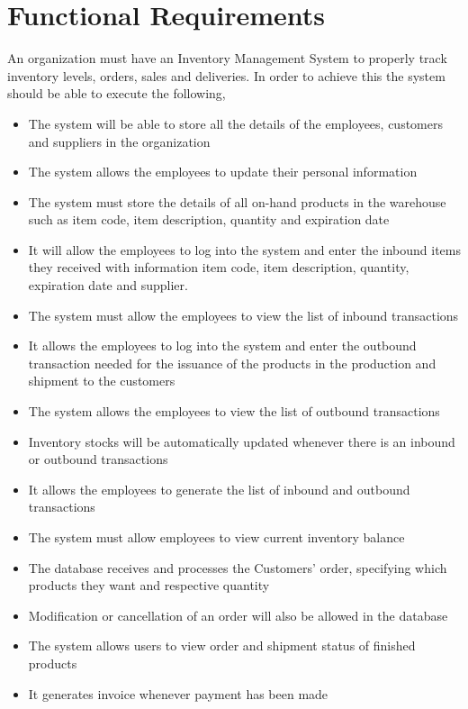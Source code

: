 \section{Functional Requirements}

An organization must have an Inventory Management System to properly track inventory levels, orders, sales and deliveries. In order to achieve this the system should be able to execute the following,

\begin{itemize}
    \item The system will be able to store all the details of the employees, customers and suppliers in the organization
    \item The system allows the employees to update their personal information
    \item The system must store the details of all on-hand products in the warehouse such as item code, item description, quantity and expiration date
    \item It will allow the employees to log into the system and enter the inbound items they received with information item code, item description, quantity, expiration date and supplier. 
    \item The system must allow the employees to view the list of inbound transactions
    \item It allows the employees to log into the system and enter the outbound transaction needed for the issuance of the products in the production and shipment to the customers
    \item The system allows the employees to view the list of outbound transactions
    \item Inventory stocks will be automatically updated whenever there is an inbound or outbound transactions
    \item It allows the employees to generate the list of inbound and outbound transactions 
    \item The system must allow employees to view current inventory balance
    \item The database receives and processes the Customers’ order, specifying which products they want and respective quantity
    \item Modification or cancellation of an order will also be allowed in the database
    \item The system allows users to view order and shipment status of finished products
    \item It generates invoice whenever payment has been made
\end{itemize}
